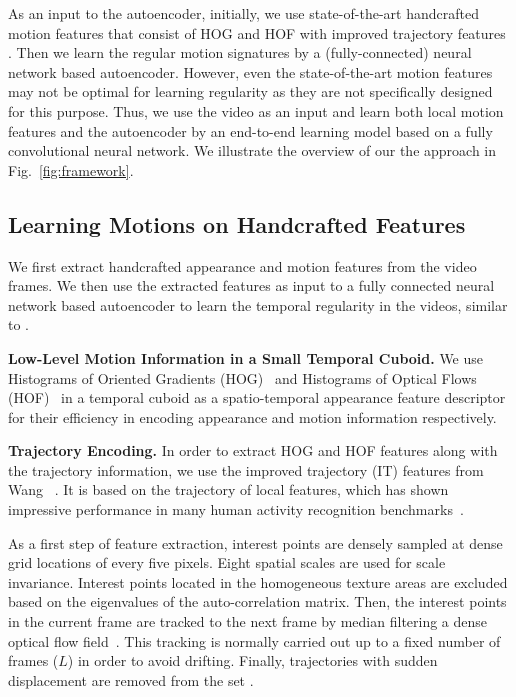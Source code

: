 \documentclass[10pt,twocolumn,letterpaper]{article}
\begin{document}
As an input to the autoencoder, initially, we use state-of-the-art handcrafted motion features that consist of HOG and HOF with improved trajectory features \cite{wang2013action}. Then we learn the regular motion signatures by a (fully-connected) neural network based autoencoder. 
However, even the state-of-the-art motion features may not be optimal for learning regularity as they are not specifically designed for this purpose.
Thus, we use the video as an input and learn both local motion features and the autoencoder by an end-to-end learning model based on a fully convolutional neural network. 
We illustrate the overview of our the approach in Fig.~\ref{fig:framework}.


\subsection{Learning Motions on Handcrafted Features}
\label{sec:local_approach}

We first extract handcrafted appearance and motion features from the video frames. 
We then use the extracted features as input to a fully connected neural network based autoencoder to learn the temporal regularity in the videos, similar to \cite{hinton2006reducing,hasanR14}.

\vspace{.5em}
\noindent \textbf{Low-Level Motion Information in a Small Temporal Cuboid.}
We use Histograms of Oriented Gradients (HOG)~\cite{DT05,laptevMSR08} and Histograms of Optical Flows (HOF)~\cite{dalal2006human} in a temporal cuboid as a spatio-temporal appearance feature descriptor for their efficiency in encoding appearance and motion information respectively. 


\vspace{.5em}
\noindent \textbf{Trajectory Encoding.}
In order to extract HOG and HOF features along with the trajectory information, we use the improved trajectory (IT) features from Wang\etal~ \cite{wang2013action}.
It is based on the trajectory of local features, which has shown impressive performance in many human activity recognition benchmarks~\cite{wang2013action,gaurZSR11}. 

As a first step of feature extraction, interest points are densely sampled at dense grid locations of every five pixels.
Eight spatial scales are used for scale invariance.
Interest points located in the homogeneous texture areas are excluded based on the eigenvalues of the auto-correlation matrix. 
Then, the interest points in the current frame are tracked to the next frame by median filtering a dense optical flow field~\cite{wangKSC11}.
This tracking is normally carried out up to a fixed number of frames ($L$) in order to avoid drifting. 
Finally, trajectories with sudden displacement are removed from the set \cite{wang2013action}.
\end{document}
